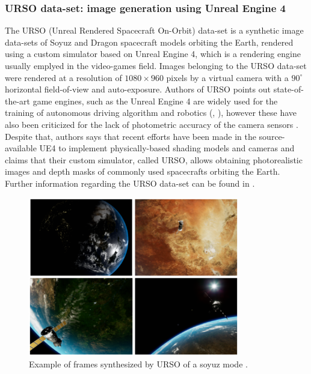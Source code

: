 \subsubsection{URSO data-set: image generation using Unreal Engine 4}
The URSO (Unreal Rendered Spacecraft On-Orbit) data-set is a synthetic image data-sets of Soyuz and Dragon spacecraft models orbiting the Earth, rendered using a custom simulator based on Unreal Engine 4, which is a rendering engine usually emplyed in the video-games field. Images belonging to the URSO data-set were rendered at a resolution of $1080 \times 960$ pixels by a virtual camera with a $90^{\circ}$ horizontal field-of-view and auto-exposure.
Authors of URSO points out state-of-the-art game engines, such as the Unreal Engine 4 are widely used for the training of autonomous driving  algorithm \cite{Dosovitskiy2017CARLAAO} and robotics (\cite{Shah2017AirSimHV}, \cite{MartinezGonzalez2019UnrealROXAE}), however these have also been criticized for the lack of photometric accuracy of the camera sensors \cite{Brochard2018ScientificIR}. Despite that, authors says that recent efforts have been made in the source-available UE4 to implement physically-based shading models and cameras and claims that their custom simulator, called URSO, allows obtaining photorealistic images and depth masks of commonly used spacecrafts orbiting the Earth. Further information regarding the URSO data-set can be found in \cite{Proena2020DeepLF}.

\begin{figure}[htbp]
  \centering
  \includegraphics[width=0.82\textwidth]{gfx/URSO.eps}
  \caption{Example of frames synthesized by URSO of a soyuz
    mode \cite{Proena2020DeepLF}.}
  \label{fig:URSO}
\end{figure}


